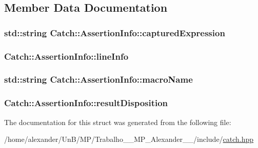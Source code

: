 \subsection{Member Data Documentation}
\hypertarget{structCatch_1_1AssertionInfo_af7c1d3cbfa346e9a303030fa0ef0cb54}{
\subsubsection[{captured\-Expression}]{\setlength{\rightskip}{0pt plus 5cm}std\-::string Catch\-::\-Assertion\-Info\-::captured\-Expression}}\label{structCatch_1_1AssertionInfo_af7c1d3cbfa346e9a303030fa0ef0cb54}
\hypertarget{structCatch_1_1AssertionInfo_a17bdbb404ba12658034f833be2f4c3e7}{
\subsubsection[{line\-Info}]{ Catch\-::\-Assertion\-Info\-::line\-Info}}\label{structCatch_1_1AssertionInfo_a17bdbb404ba12658034f833be2f4c3e7}
\hypertarget{structCatch_1_1AssertionInfo_ac2e59e8c89e00eb3390768f50d540b18}{
\subsubsection[{macro\-Name}]{\setlength{\rightskip}{0pt plus 5cm}std\-::string Catch\-::\-Assertion\-Info\-::macro\-Name}}\label{structCatch_1_1AssertionInfo_ac2e59e8c89e00eb3390768f50d540b18}
\hypertarget{structCatch_1_1AssertionInfo_a60353b3632ab2f827162f2b2d6911073}{
\subsubsection[{result\-Disposition}]{ Catch\-::\-Assertion\-Info\-::result\-Disposition}}\label{structCatch_1_1AssertionInfo_a60353b3632ab2f827162f2b2d6911073}


The documentation for this struct was generated from the following file\-:\begin{DoxyCompactItemize}
\item 
/home/alexander/\-Un\-B/\-M\-P/\-Trabalho\-\_\-\_\-\-M\-P\-\_\-\-Alexander\-\_\-\_/include/\hyperlink{catch_8hpp}{catch.\-hpp}\end{DoxyCompactItemize}
